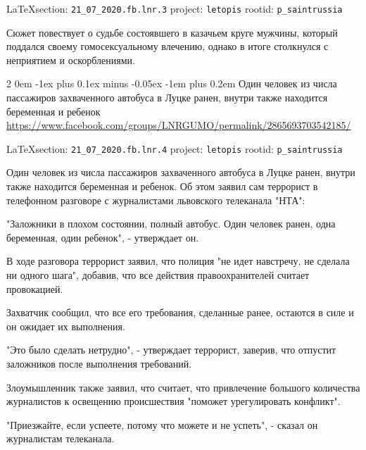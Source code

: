 \documentclass[a4paper,11pt]{extreport}
\makeatletter
\renewcommand\subsection{%
  \clearpage
    \@startsection{subsection}%
    {2}%
    {0em}%
    {-1ex plus 0.1ex minus -0.05ex}%
    {-1em plus 0.2em}%
    {\scshape\bfseries\Large}%
}
\makeatother
\begin{document}
\vspace{0.5cm}
{\small\LaTeX section: \verb|21_07_2020.fb.lnr.3| project: \verb|letopis| rootid: \verb|p_saintrussia|}
\vspace{0.5cm}

Сюжет повествует о судьбе состоявшего в казачьем круге мужчины, который
поддался своему гомосексуальному влечению, однако в итоге столкнулся с
неприятием и оскорблениями.
 
 
\subsection{Один человек из числа пассажиров захваченного автобуса в Луцке ранен, внутри также находится беременная и ребенок}
\label{sec:21_07_2020.fb.lnr.4}
\url{https://www.facebook.com/groups/LNRGUMO/permalink/2865693703542185/}
  
\vspace{0.5cm}
{\small\LaTeX section: \verb|21_07_2020.fb.lnr.4| project: \verb|letopis| rootid: \verb|p_saintrussia|}
\vspace{0.5cm}
  
Один человек из числа пассажиров захваченного автобуса в Луцке ранен, внутри
также находится беременная и ребенок.  Об этом заявил сам террорист в
телефонном разговоре с журналистами львовского телеканала "НТА":

"Заложники в плохом состоянии, полный автобус.  Один человек ранен, одна
беременная, один ребенок", - утверждает он.

В ходе разговора террорист заявил, что полиция "не идет навстречу, не сделала
ни одного шага", добавив, что все действия правоохранителей считает
провокацией.

Захватчик сообщил, что все его требования, сделанные ранее, остаются в силе и
он ожидает их выполнения.

"Это было сделать нетрудно", - утверждает террорист, заверив, что отпустит
заложников после выполнения требований.

Злоумышленник также заявил, что считает, что привлечение большого количества
журналистов к освещению происшествия "поможет урегулировать конфликт".

"Приезжайте, если успеете, потому что можете и не успеть", - сказал он
журналистам телеканала.
\end{document}
